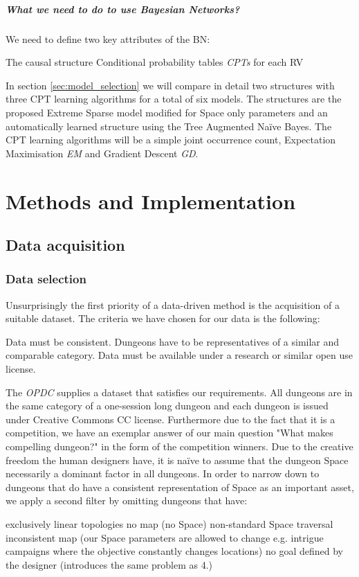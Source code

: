 \documentclass{UoYCSproject}
\begin{document}
\paragraph{What we need to do to use Bayesian Networks?}
We need to define two key attributes of the BN:
\begin{outline}[enumerate]
  \1 The causal structure
  \1 Conditional probability tables \textit{CPTs} for each RV
\end{outline}
In section \ref{sec:model_selection} we will compare in detail two structures with three CPT learning algorithms for a total of six models. The structures are the proposed Extreme Sparse model \parencite{SummervilleSamplingHyrule} modified for Space only parameters and an automatically learned structure using the Tree Augmented Na\"{i}ve Bayes. The CPT learning algorithms will be a simple joint occurrence count, Expectation Maximisation \textit{EM} and Gradient Descent \textit{GD}.

\chapter{Methods and Implementation}
\section{Data acquisition}
\subsection{Data selection} %
Unsurprisingly the first priority of a data-driven method is the acquisition of a suitable dataset. The criteria we have chosen for our data is the following:
\begin{outline}[enumerate]
  \1 Data must be consistent. Dungeons have to be representatives of a similar and comparable category.
  \1 Data must be available under a research or similar open use license.
\end{outline}
The \textit{OPDC} supplies a dataset that satisfies our requirements. All dungeons are in the same category of a one-session long dungeon and each dungeon is issued under Creative Commons CC license. Furthermore due to the fact that it is a competition, we have an exemplar answer of our main question "What makes compelling dungeon?" in the form of the competition winners. Due to the creative freedom the human designers have, it is na\"{i}ve to assume that the dungeon Space necessarily a dominant factor in all dungeons. In order to narrow down to dungeons that do have a consistent representation of Space as an important asset, we apply a second filter by omitting dungeons that have:
\begin{outline}[enumerate]
  \1 exclusively linear topologies
  \1 no map (no Space)
  \1 non-standard Space traversal
  \1 inconsistent map (our Space parameters are allowed to change e.g. intrigue campaigns where the objective constantly changes locations)
  \1 no goal defined by the designer (introduces the same problem as 4.)
\end{outline}
\end{document}
